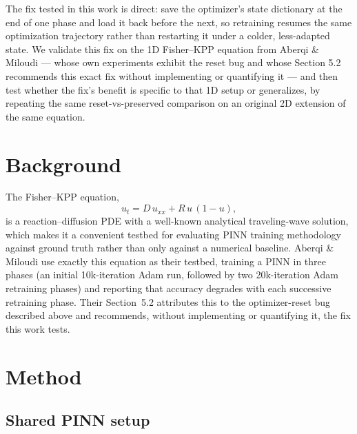 \documentclass[11pt]{article}
\begin{document}
The fix tested in this work is direct: save the optimizer's state dictionary at the end of one phase and
load it back before the next, so retraining resumes the same optimization trajectory rather than
restarting it under a colder, less-adapted state. We validate this fix on the 1D Fisher--KPP equation
from Aberqi \& Miloudi \cite{aberqi2026fisher} --- whose own experiments exhibit the reset bug and whose
Section 5.2 recommends this exact fix without implementing or quantifying it --- and then test whether
the fix's benefit is specific to that 1D setup or generalizes, by repeating the same reset-vs-preserved
comparison on an original 2D extension of the same equation.

\section{Background}

The Fisher--KPP equation,
\begin{equation}
u_t = D\,u_{xx} + R\,u\,(1-u),
\end{equation}
is a reaction--diffusion PDE with a well-known analytical traveling-wave solution, which makes it a
convenient testbed for evaluating PINN training methodology against ground truth rather than only
against a numerical baseline. Aberqi \& Miloudi \cite{aberqi2026fisher} use exactly this equation as
their testbed, training a PINN in three phases (an initial 10k-iteration Adam run, followed by two
20k-iteration Adam retraining phases) and reporting that accuracy degrades with each successive
retraining phase. Their Section~5.2 attributes this to the optimizer-reset bug described above and
recommends, without implementing or quantifying it, the fix this work tests.

\section{Method}

\subsection{Shared PINN setup}
\end{document}
